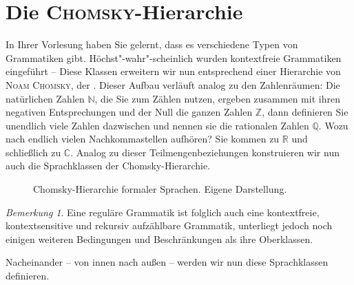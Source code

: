 \documentclass[11pt,a4paper]{scrreport}
\theoremstyle{remark}
\newtheorem{note}{Bemerkung}
\theoremstyle{custom}
\begin{document}
\section{Die \textsc{Chomsky}-Hierarchie}
In Ihrer Vorlesung haben Sie gelernt, dass es verschiedene Typen von Grammatiken gibt. Höchst"-wahr"-scheinlich wurden kontextfreie Grammatiken eingeführt -- Diese Klassen erweitern wir nun entsprechend einer Hierarchie von \textsc{Noam Chomsky}, der . Dieser Aufbau verläuft analog zu den Zahlenräumen: Die natürlichen Zahlen $\mathbb{N}$, die Sie zum Zählen nutzen, ergeben zusammen mit ihren negativen Entsprechungen und der Null die ganzen Zahlen $\mathbb{Z}$, dann definieren Sie unendlich viele Zahlen dazwischen und nennen sie die rationalen Zahlen $\mathbb{Q}$. Wozu nach endlich vielen Nachkommastellen aufhören? Sie kommen zu $\mathbb{R}$ und schließlich zu $\mathbb{C}$. Analog zu dieser Teilmengenbeziehungen konstruieren wir nun auch die Sprachklassen der Chomsky-Hierarchie.
\begin{figure}[H]
\centering
{}
\caption{Chomsky-Hierarchie formaler Sprachen. Eigene Darstellung.}
\end{figure}
\begin{note}
Eine reguläre Grammatik ist folglich auch eine kontextfreie, kontextsensitive und rekursiv aufzählbare Grammatik, unterliegt jedoch noch einigen weiteren Bedingungen und Beschränkungen als ihre Oberklassen.
\end{note}
Nacheinander -- von innen nach außen -- werden wir nun diese Sprachklassen definieren. 
\end{document}
